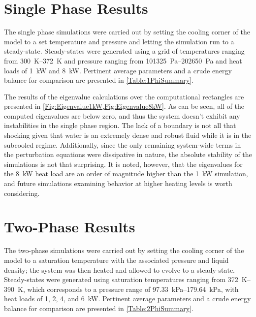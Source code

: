 \section{Single Phase Results}

The single phase simulations were carried out by setting the cooling corner of the model to a set temperature and pressure and letting the simulation run to a steady-state.
Steady-states were generated using a grid of temperatures ranging from \SIrange{300}{372}{\kelvin} and pressure ranging from \SIrange{101325}{202650}{\pascal} and heat loads of \SI{1}{\kW} and \SI{8}{\kW}.
Pertinent average parameters and a crude energy balance for comparison are presented in \cref{Table:1PhiSummary}.


The results of the eigenvalue calculations over the computational rectangles are presented in \cref{Fig:Eigenvalue1kW,Fig:Eigenvalue8kW}.
As can be seen, all of the computed eigenvalues are below zero, and thus the system doesn't exhibit any instabilities in the single phase region.
The lack of a boundary is not all that shocking given that water is an extremely dense and robust fluid while it is in the subcooled regime.
Additionally, since the only remaining system-wide terms in the perturbation equations were dissipative in nature, the absolute stability of the simulations is not that surprising.
It is noted, however, that the eigenvalues for the \SI{8}{\kW} heat load are an order of magnitude higher than the \SI{1}{\kW} simulation, and future simulations examining behavior at higher heating levels is worth considering.


\section{Two-Phase Results}

The two-phase simulations were carried out by setting the cooling corner of the model to a saturation temperature with the associated pressure and liquid density; the system was then heated and allowed to evolve to a steady-state.
Steady-states were generated using saturation temperatures ranging from \SIrange{372}{390}{\kelvin}, which corresponds to a pressure range of \SIrange{97.33}{179.64}{\kilo\pascal}, with heat loads of \num{1}, \num{2}, \num{4}, and \SI{6}{\kW}.
Pertinent average parameters and a crude energy balance for comparison are presented in \cref{Table:2PhiSummary}.

